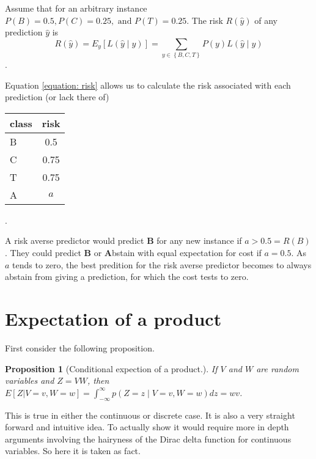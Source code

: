 \documentclass[12pt]{article}
\newtheorem{proposition}{Proposition}[section]
\newcommand{\eqnref}[1]{\ref{equation: #1}}
\newcounter{alphaenum}
\newenvironment{abclist}
    { \begin{list}{(\alph{alphaenum}) ~} { \setcounter{alphaenum}{1} \usecounter{alphaenum} } }
    { \end{list} }
\begin{document}
\begin{abclist}
\item Assume that for an arbitrary instance $P(B) = 0.5, P(C) = 0.25, \text{ and } P(T) = 0.25$.
    The risk $R(\hat y)$ of any prediction $\hat y$ is 
    \begin{equation}
        R(\hat y) = E_y[L(\hat{y} \mid y)] = \sum_{y \in \left\{ B,C,T \right\}} P(y) L(\hat{y} \mid y)
        \label{equation: risk}
    \end{equation}.

    Equation \eqnref{risk} allows us to calculate the risk associated with each prediction (or lack there of)
    \begin{center}
        \begin{tabular}{|l|c|}
            \hline
            class & risk \\
        \hline
        B & 0.5 \\
            C & 0.75 \\
            T & 0.75 \\
            A & $a$ \\
            \hline
        \end{tabular}
    \end{center}.

\item A risk averse predictor would predict {\bf B} for any new instance if $a > 0.5 = R(B)$.
    They could predict {\bf B} or {\bf A}bstain with equal expectation for cost if $a = 0.5$.
    As $a$ tends to zero, the best predition for the risk averse predictor becomes to always abstain from giving a prediction, for which the cost tests to zero.
\end{abclist}


\section{Expectation of a product}
    First consider the following proposition.
    \begin{proposition}[Conditional expection of a product.]
        If $V$ and $W$ are random variables and $Z=VW$, then $E[Z|V=v,W=w]=\int_{-\infty}^{\infty}p(Z=z \mid V=v,W=w)dz = wv$.
        \label{proposition: conditional expectation}
    \end{proposition}
    This is true in either the continuous or discrete case.
    It is also a very straight forward and intuitive idea.
    To actually show it would require more in depth arguments involving the hairyness of the Dirac delta function for continuous variables.
    So here it is taken as fact.
\end{document}
